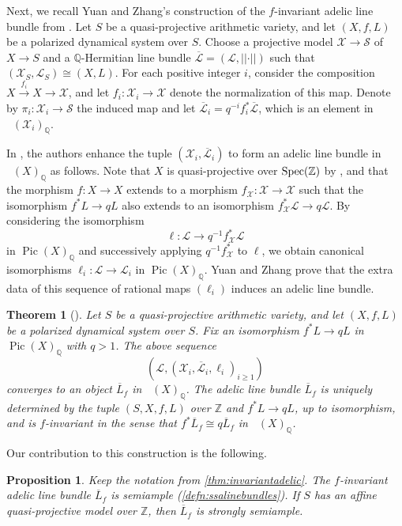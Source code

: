 \documentclass[11pt,reqno]{amsart}
\newcommand{\mZ}{\mathbb{Z}}
\newcommand{\mQ}{\mathbb{Q}}
\newcommand{\cX}{\mathcal{X}}
\newcommand{\cS}{\mathcal{S}}
\newcommand{\cL}{\mathcal{L}}
\newcommand{\nrm}[1]{\left|\left |#1\right |\right |}
\theoremstyle{theorem}
\numberwithin{equation}{subsection}
\newtheorem{theorem}[subsubsection]{Theorem}
\newtheorem{prop}[subsubsection]{Proposition}
\numberwithin{equation}{subsection}
\theoremstyle{definition}
\theoremstyle{remark}
\numberwithin{equation}{subsubsection} \numberwithin{figure}{section}
\DeclareMathOperator{\Pic}{Pic}
\DeclareMathOperator{\aPic}{\widehat{Pic}}
\DeclareMathOperator{\acPic}{\widehat{\underline{Pic}}}
\renewcommand{\geq}{\geqslant}
\begin{document}
Next, we recall Yuan and Zhang's construction of the $f$-invariant adelic line bundle from \cite[Section 6.1.1]{YuanZhang:AdelicLineBundles}. 
Let $S$ be a quasi-projective arithmetic variety, and let $(X,f,L)$ be a polarized dynamical system over $S$. 
Choose a projective model $\cX \to \cS$ of $X\to S$ and a $\mQ$-Hermitian line bundle $\overline{\cL} = (\cL,\nrm{\cdot})$ such that $(\cX_S,\cL_S) \cong (X,L)$. 
For each positive integer $i$, consider the composition $X \xrightarrow{f_i} X \to \cX$, and let $f_i\colon \cX_i \to \cX$ denote the normalization of this map. Denote by $\pi_i\colon \cX_i \to \cS$ the induced map and let $\overline{\cL}_i = q^{-i}f_i^*\overline{\cL}$, which is an element in $\aPic(\cX_i)_{\mQ}$. 


In \cite[Section 6.1.1]{YuanZhang:AdelicLineBundles}, the authors enhance the tuple $(\cX_i,\overline{\cL}_i)$ to form an adelic line bundle in $\acPic(X)_{\mQ}$ as follows. 
Note that $X$ is quasi-projective over $\Spec(\mZ)$ by \cite[\href{https://stacks.math.columbia.edu/tag/0C4M}{Tag 0C4M}]{stacks-project}, and that the morphism $f\colon X \to X$ extends to a morphism $f_{\cX}\colon \cX \to \cX$ such that the isomorphism $f^*L \to qL$ also extends to an isomorphism $f_{\cX}^*\cL \to q\cL$. 
By considering the isomorphism
\[
\ell\colon \cL \to q^{-1}f_{\cX}^*\cL
\]
in $\Pic(X)_{\mQ}$ and successively applying $q^{-1}f_{\cX}^*$ to $\ell$, we obtain canonical isomorphisms $\ell_i\colon \cL \to \cL_i$ in $\Pic(X)_{\mQ}$. 
Yuan and Zhang prove that the extra data of this sequence of rational maps $(\ell_i)$ induces an adelic line bundle. 

\begin{theorem}[]
\label{thm:invariantadelic}
Let $S$ be a quasi-projective arithmetic variety, and let $(X,f,L)$ be a polarized dynamical system over $S$. 
Fix an isomorphism $f^*L \to qL$ in $\Pic(X)_{\mQ}$ with $q>1$. The above sequence 
\[
(\cL,(\cX_i,\overline{\cL}_i,\ell_i)_{i\geq 1})
\]
converges to an object $\overline{L}_f$ in $\acPic(X)_{\mQ}$. 
The adelic line bundle $\overline{L}_f$ is uniquely determined by the tuple $(S,X,f,L)$ over $\mZ$ and $f^{*}L \to qL$, up to isomorphism, and is $f$-invariant in the sense that $f^*\overline{L}_f \cong q\overline{L}_f$ in $\aPic(X)_{\mQ}$. 
\end{theorem}

Our contribution to this construction is the following. 

\begin{prop}\label{prop:invariant_ssa}
Keep the notation from \autoref{thm:invariantadelic}. 
The $f$-invariant adelic line bundle $\overline{L}_f$ is semiample (\autoref{defn:ssalinebundles}). 
If $S$ has an affine quasi-projective model over $\mZ$, then $\overline{L}_f$ is strongly semiample. 
\end{prop}
\end{document}
